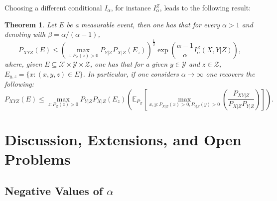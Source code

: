 \documentclass{article}
\newtheorem{theorem}{Theorem}
\numberwithin{theorem}{section}
\numberwithin{example}{section}
\numberwithin{remark}{section}
\numberwithin{definition}{section}
\newcommand{\X}{\mathcal{X}}
\newcommand{\Y}{\mathcal{Y}}
\begin{document}
Choosing a different conditional $I_\alpha$, for instance $I_\alpha^Z$, leads to the following result:
\begin{theorem}
    Let $E$ be a measurable event, then one has that for every $\alpha>1$ and denoting with $\beta=\alpha/(\alpha-1)$,
    \begin{equation}
        P_{XYZ}(E) \leq \left(\max_{z:P_Z(z)>0}P_{Y|Z}P_{X|Z}(E_{z})\right)^\frac{1}{\beta}\exp\left(\frac{\alpha-1}{\alpha}I_\alpha^{Z}(X,Y|Z)\right),
    \end{equation}
    where,  given $E\subseteq \X\times\Y\times \mathcal{Z}$, one has that for a given $y\in\Y$ and $z\in\mathcal{Z}$, $E_{y,z}=\{x:(x,y,z)\in E\}$.
    In particular, if one considers $\alpha\to\infty$ one recovers the following:
    \begin{equation}
        P_{XYZ}(E) \leq \max_{z:P_Z(z)>0}P_{Y|Z}P_{X|Z}(E_{z})\left(\mathbb{E}_{P_Z}\left[\max_{x,y: P_{X|Z}(x)>0, P_{Y|Z}(y)>0}\left(\frac{P_{XY|Z}}{P_{X|Z}P_{Y|Z}}\right)\right]\right).
    \end{equation}
    
\end{theorem}



\fi
\section{Discussion, Extensions, and Open Problems} \label{sec:discussion}


\subsection{Negative Values of $\alpha$}
\label{app:negativeAlpha}

\end{document}
